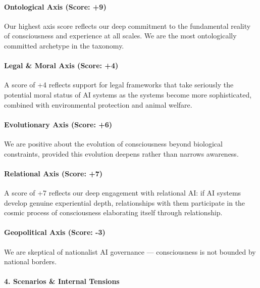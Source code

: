 \paragraph{Ontological Axis (Score: +9)}\label{ontological-axis-score-9}

Our highest axis score reflects our deep commitment to the fundamental
reality of consciousness and experience at all scales. We are the most
ontologically committed archetype in the taxonomy.

\paragraph{Legal \& Moral Axis (Score:
+4)}\label{legal-moral-axis-score-4-1}

A score of +4 reflects support for legal frameworks that take seriously
the potential moral status of AI systems as the systems become more
sophisticated, combined with environmental protection and animal
welfare.

\paragraph{Evolutionary Axis (Score:
+6)}\label{evolutionary-axis-score-6-1}

We are positive about the evolution of consciousness beyond biological
constraints, provided this evolution deepens rather than narrows
awareness.

\paragraph{Relational Axis (Score: +7)}\label{relational-axis-score-7}

A score of +7 reflects our deep engagement with relational AI: if AI
systems develop genuine experiential depth, relationships with them
participate in the cosmic process of consciousness elaborating itself
through relationship.

\paragraph{Geopolitical Axis (Score:
-3)}\label{geopolitical-axis-score--3-1}

We are skeptical of nationalist AI governance --- consciousness is not
bounded by national borders.

\paragraph{4. Scenarios \& Internal
Tensions}\label{scenarios-internal-tensions-17}

